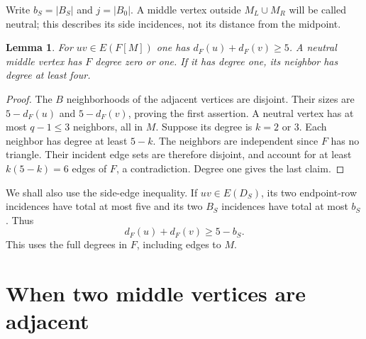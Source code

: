 \documentclass[11pt]{article}
\newtheorem{lemma}[theorem]{Lemma}
\begin{document}
Write $b_S=|B_S|$ and $j=|B_0|$. A middle vertex outside $M_L\cup M_R$
will be called neutral; this describes its side incidences, not its
distance from the midpoint.

\begin{lemma}\label{edge}
For $uv\in E(F[M])$ one has $d_F(u)+d_F(v)\geq5$. A neutral middle
vertex has $F$ degree zero or one. If it has degree one, its neighbor
has degree at least four.
\end{lemma}
\begin{proof}
The $B$ neighborhoods of the adjacent vertices are disjoint. Their
sizes are $5-d_F(u)$ and $5-d_F(v)$, proving the first assertion.
A neutral vertex has at most $q-1\leq3$ neighbors, all in $M$. Suppose
its degree is $k=2$ or $3$. Each neighbor has degree at least $5-k$.
The neighbors are independent since $F$ has no triangle. Their incident
edge sets are therefore disjoint, and account for at least
$k(5-k)=6$ edges of $F$, a contradiction. Degree one gives the last claim.
\end{proof}

We shall also use the side-edge inequality. If $uv\in E(D_S)$, its two
endpoint-row incidences have total at most five and its two $B_S$
incidences have total at most $b_S$. Thus
\begin{equation}\label{sideedge}
 d_F(u)+d_F(v)\geq5-b_S.
\end{equation}
This uses the full degrees in $F$, including edges to $M$.

\section{When two middle vertices are adjacent}
\end{document}
